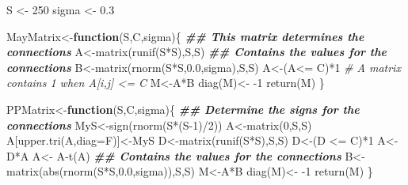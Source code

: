 \documentclass[
]{article}
\newenvironment{Shaded}{\begin{snugshade}}{\end{snugshade}}
\newcommand{\AttributeTok}[1]{\textcolor[rgb]{0.77,0.63,0.00}{#1}}
\newcommand{\CommentTok}[1]{\textcolor[rgb]{0.56,0.35,0.01}{\textit{#1}}}
\newcommand{\ControlFlowTok}[1]{\textcolor[rgb]{0.13,0.29,0.53}{\textbf{#1}}}
\newcommand{\DecValTok}[1]{\textcolor[rgb]{0.00,0.00,0.81}{#1}}
\newcommand{\DocumentationTok}[1]{\textcolor[rgb]{0.56,0.35,0.01}{\textbf{\textit{#1}}}}
\newcommand{\FloatTok}[1]{\textcolor[rgb]{0.00,0.00,0.81}{#1}}
\newcommand{\FunctionTok}[1]{\textcolor[rgb]{0.00,0.00,0.00}{#1}}
\newcommand{\NormalTok}[1]{#1}
\newcommand{\OtherTok}[1]{\textcolor[rgb]{0.56,0.35,0.01}{#1}}
\newcommand{\SpecialCharTok}[1]{\textcolor[rgb]{0.00,0.00,0.00}{#1}}
\begin{document}
\begin{Shaded}
\begin{Highlighting}[]
\NormalTok{S }\OtherTok{\textless{}{-}} \DecValTok{250}
\NormalTok{sigma }\OtherTok{\textless{}{-}} \FloatTok{0.3}

\NormalTok{MayMatrix}\OtherTok{\textless{}{-}}\ControlFlowTok{function}\NormalTok{(S,C,sigma)\{}
  \DocumentationTok{\#\# This matrix determines the connections}
\NormalTok{  A}\OtherTok{\textless{}{-}}\FunctionTok{matrix}\NormalTok{(}\FunctionTok{runif}\NormalTok{(S}\SpecialCharTok{*}\NormalTok{S),S,S)}
  \DocumentationTok{\#\# Contains the values for the connections}
\NormalTok{  B}\OtherTok{\textless{}{-}}\FunctionTok{matrix}\NormalTok{(}\FunctionTok{rnorm}\NormalTok{(S}\SpecialCharTok{*}\NormalTok{S,}\FloatTok{0.0}\NormalTok{,sigma),S,S)}
\NormalTok{  A}\OtherTok{\textless{}{-}}\NormalTok{(A}\SpecialCharTok{\textless{}=}\NormalTok{ C)}\SpecialCharTok{*}\DecValTok{1} \CommentTok{\# A matrix contains 1 when A[i,j] \textless{}= C}
\NormalTok{  M}\OtherTok{\textless{}{-}}\NormalTok{A}\SpecialCharTok{*}\NormalTok{B}
  \FunctionTok{diag}\NormalTok{(M)}\OtherTok{\textless{}{-}} \SpecialCharTok{{-}}\DecValTok{1}
  \FunctionTok{return}\NormalTok{(M)}
\NormalTok{\}}

\NormalTok{PPMatrix}\OtherTok{\textless{}{-}}\ControlFlowTok{function}\NormalTok{(S,C,sigma)\{}
  \DocumentationTok{\#\# Determine the signs for the connections}
\NormalTok{  MyS}\OtherTok{\textless{}{-}}\FunctionTok{sign}\NormalTok{(}\FunctionTok{rnorm}\NormalTok{(S}\SpecialCharTok{*}\NormalTok{(S}\DecValTok{{-}1}\NormalTok{)}\SpecialCharTok{/}\DecValTok{2}\NormalTok{))}
\NormalTok{  A}\OtherTok{\textless{}{-}}\FunctionTok{matrix}\NormalTok{(}\DecValTok{0}\NormalTok{,S,S)}
\NormalTok{  A[}\FunctionTok{upper.tri}\NormalTok{(A,}\AttributeTok{diag=}\NormalTok{F)]}\OtherTok{\textless{}{-}}\NormalTok{MyS}
\NormalTok{  D}\OtherTok{\textless{}{-}}\FunctionTok{matrix}\NormalTok{(}\FunctionTok{runif}\NormalTok{(S}\SpecialCharTok{*}\NormalTok{S),S,S)}
\NormalTok{  D}\OtherTok{\textless{}{-}}\NormalTok{(D }\SpecialCharTok{\textless{}=}\NormalTok{ C)}\SpecialCharTok{*}\DecValTok{1}
\NormalTok{  A}\OtherTok{\textless{}{-}}\NormalTok{D}\SpecialCharTok{*}\NormalTok{A}
\NormalTok{  A}\OtherTok{\textless{}{-}}\NormalTok{ A}\SpecialCharTok{{-}}\FunctionTok{t}\NormalTok{(A)}
  \DocumentationTok{\#\# Contains the  values for the connections}
\NormalTok{  B}\OtherTok{\textless{}{-}}\FunctionTok{matrix}\NormalTok{(}\FunctionTok{abs}\NormalTok{(}\FunctionTok{rnorm}\NormalTok{(S}\SpecialCharTok{*}\NormalTok{S,}\FloatTok{0.0}\NormalTok{,sigma)),S,S)}
\NormalTok{  M}\OtherTok{\textless{}{-}}\NormalTok{A}\SpecialCharTok{*}\NormalTok{B}
  \FunctionTok{diag}\NormalTok{(M)}\OtherTok{\textless{}{-}} \SpecialCharTok{{-}}\DecValTok{1}
  \FunctionTok{return}\NormalTok{(M)}
\NormalTok{\}}


\end{Highlighting}
\end{Shaded}
\end{document}
